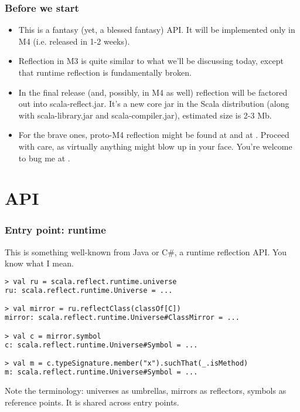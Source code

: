 \documentclass[hyperref={bookmarks=false}]{beamer}
\begin{document}
\begin{frame}[fragile]
\frametitle{Before we start}

\begin{itemize}
\item This is a fantasy (yet, a blessed fantasy) API. It will be implemented only in M4 (i.e. released in 1-2 weeks).

\item Reflection in M3 is quite similar to what we'll be discussing today, except that runtime reflection is fundamentally broken.

\item In the final release (and, possibly, in M4 as well) reflection will be factored out into scala-reflect.jar.
It's a new core jar in the Scala distribution (along with scala-library.jar and scala-compiler.jar), estimated size is 2-3 Mb.

\item For the brave ones, proto-M4 reflection might be found at  and at . Proceed with care, as virtually anything might blow up in your face. You're welcome to bug me at
.
\end{itemize}

\end{frame}

\section{API}

\begin{frame}[fragile]
\frametitle{Entry point: runtime}

This is something well-known from Java or C\#, a runtime reflection API.
You know what I mean.

\begin{lstlisting}[language=XML]
> val ru = scala.reflect.runtime.universe
ru: scala.reflect.runtime.Universe = ...

> val mirror = ru.reflectClass(classOf[C])
mirror: scala.reflect.runtime.Universe#ClassMirror = ...

> val c = mirror.symbol
c: scala.reflect.runtime.Universe#Symbol = ...

> val m = c.typeSignature.member("x").suchThat(_.isMethod)
m: scala.reflect.runtime.Universe#Symbol = ...
\end{lstlisting}

Note the terminology: universes as umbrellas, mirrors as reflectors,
symbols as reference points. It is shared across entry points.

\end{frame}
\end{document}
